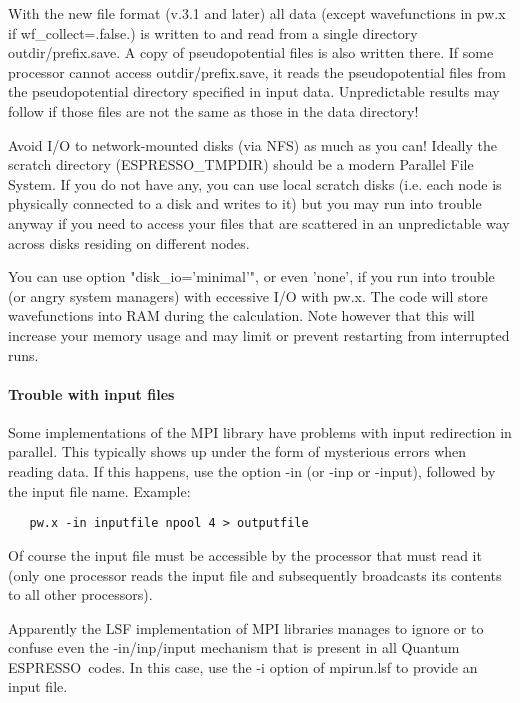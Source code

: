 \documentclass[12pt,a4paper]{article}
\def\qe{{\sc Quantum ESPRESSO}}
\begin{document}
With the new file format (v.3.1 and later) all data (except 
wavefunctions in pw.x if wf\_collect=.false.) is written to and read from
a single directory outdir/prefix.save. A copy of pseudopotential files
is also written there. If some processor cannot access outdir/prefix.save,
it reads the pseudopotential files from the pseudopotential directory
specified in input data. Unpredictable results may follow if those files
are not the same as those in the data directory!

Avoid I/O to network-mounted disks (via NFS) as much as you can! 
Ideally the scratch directory (ESPRESSO\_TMPDIR) should be a modern 
Parallel File System. If you do not have any, you can use local
scratch disks (i.e. each node is physically connected to a disk
and writes to it) but you may run into trouble anyway if you 
need to access your files that are scattered in an unpredictable
way across disks residing on different nodes.

You can use option "disk\_io='minimal'", or even 'none', if you run
into trouble (or angry system managers) with eccessive I/O with pw.x. 
The code will store wavefunctions into RAM during the calculation.
Note however that this will increase your memory usage and may limit 
or prevent restarting from interrupted runs.

\paragraph{Trouble with input files}
Some implementations of the MPI library have problems with input 
redirection in parallel. This typically shows up under the form of
mysterious errors when reading data. If this happens, use the option 
-in (or -inp or -input), followed by the input file name. 
Example:
\begin{verbatim}
   pw.x -in inputfile npool 4 > outputfile
\end{verbatim} 
Of course the 
input file must be accessible by the processor that must read it
(only one processor reads the input file and subsequently broadcasts
its contents to all other processors).

Apparently the LSF implementation of MPI libraries manages to ignore or to
confuse even the -in/inp/input mechanism that is present in all
\qe\ codes. In this case, use the -i option of mpirun.lsf
to provide an input file.
\end{document}

